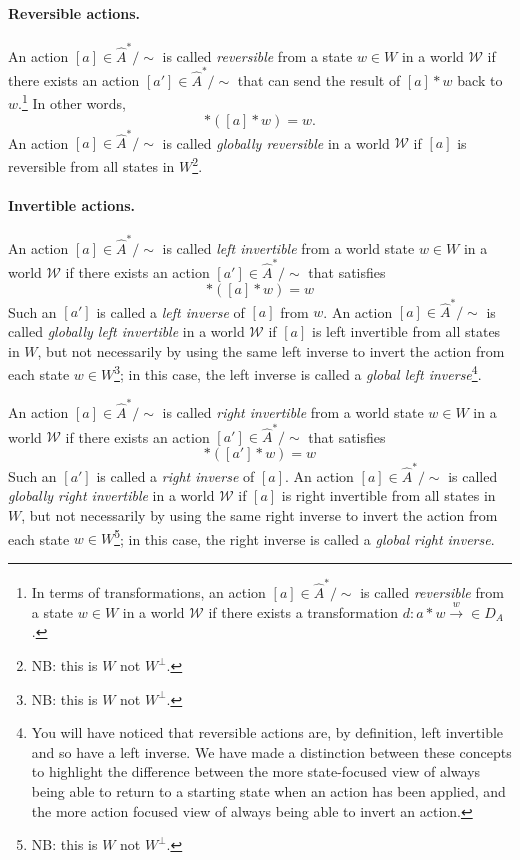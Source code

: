 \paragraph{Reversible actions.}
An action $[a] \in \hat{A}^{*}/\sim$ is called \emph{reversible} from a state $w \in W$ in a world $\mathscr{W}$ if there exists an action $[a'] \in \hat{A}^{*}/\sim$ that can send the result of $[a] \ast w$ back to $w$.\footnote{
In terms of transformations, an action $[a] \in \hat{A}^{*}/\sim$ is called \emph{reversible} from a state $w \in W$ in a world $\mathscr{W}$ if there exists a transformation $d: a * w \xrightarrow w \in D_{A}$.
}
In other words,
\begin{equation}
    [a'] * ([a] * w) = w.
\end{equation}
An action $[a] \in \hat{A}^{*}/\sim$ is called \emph{globally reversible} in a world $\mathscr{W}$ if $[a]$ is reversible from all states in $W$\footnote{
NB: this is $W$ not $W^{\bot}$.
}.

\paragraph{Invertible actions.}
An action $[a] \in \hat{A}^{*}/\sim$ is called \emph{left invertible} from a world state $w \in W$ in a world $\mathscr{W}$ if there exists an action $[a'] \in \hat{A}^{*}/\sim$ that satisfies
\begin{equation}
    [a'] * ([a] * w) = w
\end{equation}
Such an $[a']$ is called a \emph{left inverse} of $[a]$ from $w$.
An action $[a] \in \hat{A}^{*}/\sim$ is called \emph{globally left invertible} in a world $\mathscr{W}$ if $[a]$ is left invertible from all states in $W$, but not necessarily by using the same left inverse to invert the action from each state $w \in W$\footnote{
NB: this is $W$ not $W^{\bot}$.
}; in this case, the left inverse is called a \emph{global left inverse}\footnote{
You will have noticed that reversible actions are, by definition, left invertible and so have a left inverse.
We have made a distinction between these concepts to highlight the difference between the more state-focused view of always being able to return to a starting state when an action has been applied, and the more action focused view of always being able to invert an action.
}.

An action $[a] \in \hat{A}^{*}/\sim$ is called \emph{right invertible} from a world state $w \in W$ in a world $\mathscr{W}$ if there exists an action $[a'] \in \hat{A}^{*}/\sim$ that satisfies
\begin{equation}
    [a] * ([a'] * w) = w
\end{equation}
Such an $[a']$ is called a \emph{right inverse} of $[a]$.
An action $[a] \in \hat{A}^{*}/\sim$ is called \emph{globally right invertible} in a world $\mathscr{W}$ if $[a]$ is right invertible from all states in $W$, but not necessarily by using the same right inverse to invert the action from each state $w \in W$\footnote{
NB: this is $W$ not $W^{\bot}$.
}; in this case, the right inverse is called a \emph{global right inverse}.

